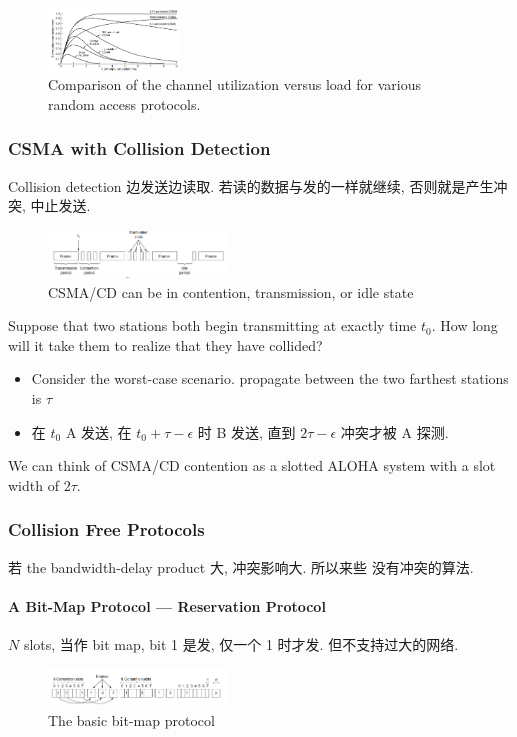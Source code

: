 \begin{figure}[!htb]
    \centering
    \includegraphics[width=0.309\textwidth]{pic/CN4/Comparison of the channel utilization}
    \caption{Comparison of the channel utilization versus load for various random access protocols.}
\end{figure}


\subsubsection{CSMA with Collision Detection}
Collision detection 边发送边读取. 若读的数据与发的一样就继续, 否则就是产生冲突, 中止发送. 

\begin{figure}[!htb]
    \centering
    \includegraphics[width=0.42\textwidth]{pic/CN4/CSMA CD}
    \caption{CSMA/CD can be in contention, transmission, or idle state}
\end{figure}

Suppose that two stations both begin transmitting at exactly time $t_0$. How long will it take them to realize that they have collided?
\begin{itemize}
    \item Consider the worst-case scenario. propagate between the two farthest stations is $\tau$
    \item 在 $t_0$ A 发送, 在 $t_0 + \tau -\epsilon$ 时 B 发送, 直到 $2\tau-\epsilon$ 冲突才被 A 探测. 
\end{itemize}
We can think of CSMA/CD contention as a slotted ALOHA system with a slot width of $2\tau$.  

\subsubsection{Collision Free Protocols}
若 the bandwidth-delay product 大, 冲突影响大. 所以来些 没有冲突的算法. 

\paragraph{A Bit-Map Protocol --- Reservation Protocol} $N$ slots, 当作 bit map, bit 1 是发, 仅一个 1 时才发. 但不支持过大的网络. 
\begin{figure}[!htb]
    \centering
    \includegraphics[width=0.42\textwidth]{pic/CN4/The basic bit-map protocol}
    \caption{The basic bit-map protocol}
\end{figure}

